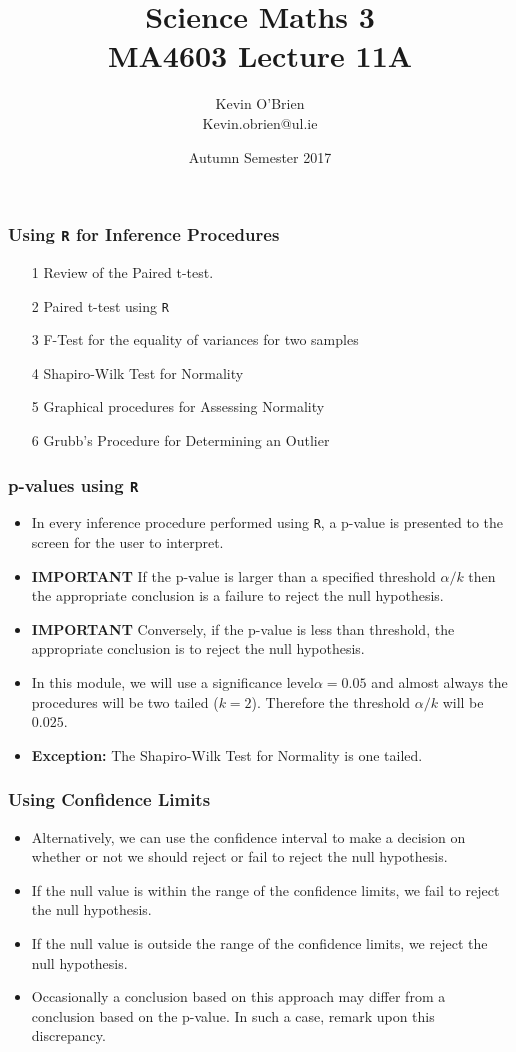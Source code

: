 \documentclass[a4]{beamer}
\title[MA4603]{Science Maths 3 \\ {\normalsize MA4603 Lecture 11A}}
\author[Kevin O'Brien]{Kevin O'Brien \\ {\scriptsize Kevin.obrien@ul.ie}}
\date{Autumn Semester 2017}
\institute[Maths \& Stats]{Dept. of Mathematics \& Statistics, \\ University \textit{of} Limerick}
\begin{document}
\begin{frame}
\titlepage
\end{frame}

\begin{frame}
\frametitle{Using \texttt{R} for Inference Procedures}
\begin{itemize}
\item[1] Review of the Paired t-test.
\item[2] Paired t-test using \texttt{R}
\item[3] F-Test for the equality of variances for two samples
\item[4] Shapiro-Wilk Test for Normality
\item[5] Graphical procedures for Assessing Normality
\item[6] Grubb's Procedure for Determining an Outlier
\end{itemize}
\end{frame}
\begin{frame}
\frametitle{p-values using \texttt{R}}
\begin{itemize}
\item In every inference procedure performed using \texttt{R}, a p-value is presented to the screen for the user to interpret.

\item \textbf{IMPORTANT} If the p-value is larger than a specified threshold $\alpha/k$ then the appropriate conclusion is a
failure to reject the null hypothesis.

\item \textbf{IMPORTANT} Conversely, if the p-value is less than threshold, the appropriate conclusion is to reject the null hypothesis.

\item In this module, we will use a significance level$\alpha=0.05$ and almost always the procedures will be two tailed ($k=2$). Therefore the threshold $\alpha/k$ will be $0.025$.
\item \textbf{Exception:} The Shapiro-Wilk Test for Normality is one tailed.
\end{itemize}
\end{frame}

\begin{frame}
\frametitle{Using Confidence Limits}
\begin{itemize}
\item Alternatively, we can use the confidence interval to make a decision on whether or not we should reject or fail to reject the null hypothesis.
\item If the null value is within the range of the confidence limits, we fail to reject the null hypothesis.
\item If the null value is outside the range of the confidence limits, we reject the null hypothesis.
\item Occasionally a conclusion based on this approach may differ from a conclusion based on the p-value. In such a case, remark upon this discrepancy.
\end{itemize}
\end{frame}
\end{document}
